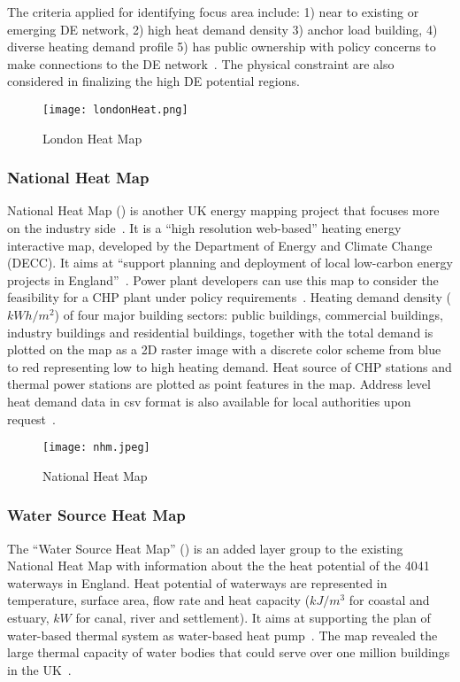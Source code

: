 The criteria applied for identifying focus area include: 1) near to
existing or emerging DE network, 2) high heat demand density 3) anchor
load building, 4) diverse heating demand profile 5) has public
ownership with policy concerns to make connections to the DE
network~\cite{decentralHeatMap2011}. The physical constraint are also
considered in finalizing the high DE potential regions.

\begin{figure}[h!]
  \centering
  \texttt{[image: londonHeat.png]}
  \caption[London Heat Map]{London Heat Map~\cite{londonHeatMapMap}}
  \label{fig:londonHeat}
\end{figure}

\subsubsection{National Heat Map}
National Heat Map () is another UK energy mapping
project that focuses more on the industry
side~\cite{decentralHeatMap2011}. It is a ``high resolution
web-based'' heating energy interactive map, developed by the
Department of Energy and Climate Change (DECC). It aims at ``support
planning and deployment of local low-carbon energy projects in
England''~\cite{heatMap2015}. Power plant developers can use this map
to consider the feasibility for a CHP plant under policy
requirements~\cite{decentralHeatMap2011}. Heating demand density
($kWh/m^2$) of four major building sectors: public buildings,
commercial buildings, industry buildings and residential buildings,
together with the total demand is plotted on the map as a 2D raster
image with a discrete color scheme from blue to red representing low
to high heating demand. Heat source of CHP stations and thermal power
stations are plotted as point features in the map. Address level heat
demand data in csv format is also available for local authorities upon
request~\cite{heatMapLocal2012}.

\begin{figure}[h!]
  \centering
  \texttt{[image: nhm.jpeg]}
  \caption[National Heat Map]{National Heat Map~\cite{heatMap2012}}
  \label{fig:nhm}
\end{figure}

\subsubsection{Water Source Heat Map}
The ``Water Source Heat Map'' () is an added layer
group to the existing National Heat Map with information about the the
heat potential of the 4041 waterways in England. Heat potential of
waterways are represented in temperature, surface area, flow rate and
heat capacity ($kJ/m^3$ for coastal and estuary, $kW$ for canal, river
and settlement). It aims at supporting the plan of water-based thermal
system as water-based heat pump~\cite{waterHeatMap}. The map revealed
the large thermal capacity of water bodies that could serve over one
million buildings in the UK~\cite{waterHeatMap}.

